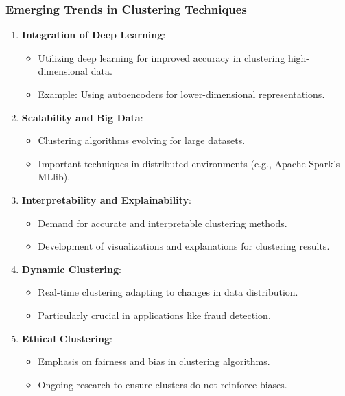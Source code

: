 \documentclass{beamer}
\begin{document}
\begin{frame}
    \frametitle{Emerging Trends in Clustering Techniques}
    \begin{enumerate}
        \item \textbf{Integration of Deep Learning}:
        \begin{itemize}
            \item Utilizing deep learning for improved accuracy in clustering high-dimensional data.
            \item Example: Using autoencoders for lower-dimensional representations.
        \end{itemize}
        
        \item \textbf{Scalability and Big Data}:
        \begin{itemize}
            \item Clustering algorithms evolving for large datasets.
            \item Important techniques in distributed environments (e.g., Apache Spark's MLlib).
        \end{itemize}
        
        \item \textbf{Interpretability and Explainability}:
        \begin{itemize}
            \item Demand for accurate and interpretable clustering methods.
            \item Development of visualizations and explanations for clustering results.
        \end{itemize}
        
        \item \textbf{Dynamic Clustering}:
        \begin{itemize}
            \item Real-time clustering adapting to changes in data distribution.
            \item Particularly crucial in applications like fraud detection.
        \end{itemize}

        \item \textbf{Ethical Clustering}:
        \begin{itemize}
            \item Emphasis on fairness and bias in clustering algorithms.
            \item Ongoing research to ensure clusters do not reinforce biases.
        \end{itemize}
    \end{enumerate}
\end{frame}
\end{document}
